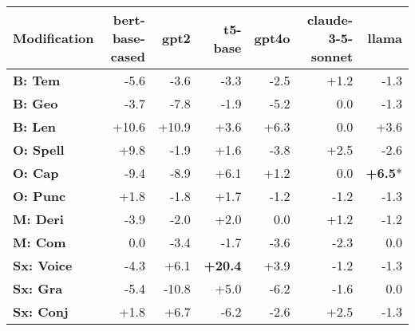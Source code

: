 \begin{table}[h]
\centering
\begin{tabular}{lrrrrrr}
\hline
Modification & \textbf{bert-base-cased} & \textbf{gpt2} & \textbf{t5-base} & \textbf{gpt4o} & \textbf{claude-3-5-sonnet} & \textbf{llama} \\
\hline
\textbf{B: Tem} & \cellcolor{red!16} -5.6 & \cellcolor{red!10} -3.6 & \cellcolor{red!9} -3.3 & \cellcolor{red!7} -2.5 & \cellcolor{green!3} +1.2 & \cellcolor{red!3} -1.3 \\
\textbf{B: Geo} & \cellcolor{red!11} -3.7 & \cellcolor{red!23} -7.8 & \cellcolor{red!5} -1.9 & \cellcolor{red!15} -5.2 & \cellcolor{red!0} 0.0 & \cellcolor{red!3} -1.3 \\
\textbf{B: Len} & \cellcolor{green!30} +10.6 & \cellcolor{green!30} +10.9 & \cellcolor{green!10} +3.6 & \cellcolor{green!18} +6.3 & \cellcolor{red!0} 0.0 & \cellcolor{green!10} +3.6 \\
\hline
\textbf{O: Spell} & \cellcolor{green!29} +9.8 & \cellcolor{red!5} -1.9 & \cellcolor{green!4} +1.6 & \cellcolor{red!11} -3.8 & \cellcolor{green!7} +2.5 & \cellcolor{red!7} -2.6 \\
\textbf{O: Cap} & \cellcolor{red!28} -9.4 & \cellcolor{red!26} -8.9 & \cellcolor{green!18} +6.1 & \cellcolor{green!3} +1.2 & \cellcolor{red!0} 0.0 & \cellcolor{green!19} \textbf{+6.5}* \\
\textbf{O: Punc} & \cellcolor{green!5} +1.8 & \cellcolor{red!5} -1.8 & \cellcolor{green!5} +1.7 & \cellcolor{red!3} -1.2 & \cellcolor{red!3} -1.2 & \cellcolor{red!3} -1.3 \\
\hline
\textbf{M: Deri} & \cellcolor{red!11} -3.9 & \cellcolor{red!6} -2.0 & \cellcolor{green!6} +2.0 & \cellcolor{red!0} 0.0 & \cellcolor{green!3} +1.2 & \cellcolor{red!3} -1.2 \\
\textbf{M: Com} & \cellcolor{red!0} 0.0 & \cellcolor{red!10} -3.4 & \cellcolor{red!5} -1.7 & \cellcolor{red!10} -3.6 & \cellcolor{red!6} -2.3 & \cellcolor{red!0} 0.0 \\
\hline
\textbf{Sx: Voice} & \cellcolor{red!12} -4.3 & \cellcolor{green!18} +6.1 & \cellcolor{green!30} \textbf{+20.4} & \cellcolor{green!11} +3.9 & \cellcolor{red!3} -1.2 & \cellcolor{red!3} -1.3 \\
\textbf{Sx: Gra} & \cellcolor{red!16} -5.4 & \cellcolor{red!30} -10.8 & \cellcolor{green!15} +5.0 & \cellcolor{red!18} -6.2 & \cellcolor{red!4} -1.6 & \cellcolor{red!0} 0.0 \\
\textbf{Sx: Conj} & \cellcolor{green!5} +1.8 & \cellcolor{green!20} +6.7 & \cellcolor{red!18} -6.2 & \cellcolor{red!7} -2.6 & \cellcolor{green!7} +2.5 & \cellcolor{red!3} -1.3 \\

\end{tabular}
\end{table}
